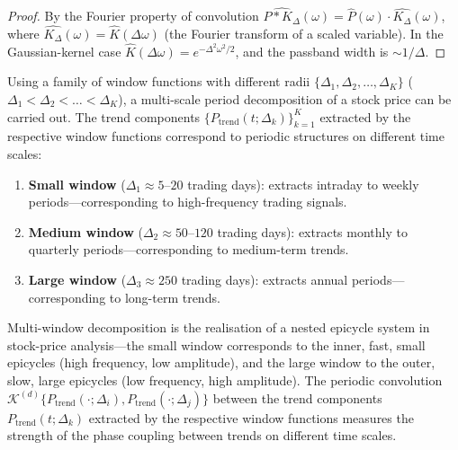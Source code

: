 \begin{proof}
By the Fourier property of convolution $\widehat{P * K_\Delta}(\omega) = \hat P(\omega)\cdot \widehat{K_\Delta}(\omega)$, where $\widehat{K_\Delta}(\omega) = \hat K(\Delta\omega)$ (the Fourier transform of a scaled variable). In the Gaussian-kernel case $\hat K(\Delta\omega) = e^{-\Delta^2\omega^2/2}$, and the passband width is $\sim 1/\Delta$.
\end{proof}

\begin{proposition}\label{prop:multi_window_stock}
Using a family of window functions with different radii $\{\Delta_1, \Delta_2, \dots, \Delta_K\}$ ($\Delta_1 < \Delta_2 < \dots < \Delta_K$), a multi-scale period decomposition of a stock price can be carried out. The trend components $\{P_{\text{trend}}(t; \Delta_k)\}_{k=1}^{K}$ extracted by the respective window functions correspond to periodic structures on different time scales:
\begin{enumerate}[label=(\roman*)]
    \item \textbf{Small window} ($\Delta_1 \approx 5$--$20$ trading days): extracts intraday to weekly periods---corresponding to high-frequency trading signals.
    \item \textbf{Medium window} ($\Delta_2 \approx 50$--$120$ trading days): extracts monthly to quarterly periods---corresponding to medium-term trends.
    \item \textbf{Large window} ($\Delta_3 \approx 250$ trading days): extracts annual periods---corresponding to long-term trends.
\end{enumerate}
Multi-window decomposition is the realisation of a nested epicycle system in stock-price analysis---the small window corresponds to the inner, fast, small epicycles (high frequency, low amplitude), and the large window to the outer, slow, large epicycles (low frequency, high amplitude). The periodic convolution $\mathcal{K}^{(d)}\{P_{\text{trend}}(\cdot; \Delta_i), P_{\text{trend}}(\cdot; \Delta_j)\}$ between the trend components $P_{\text{trend}}(t; \Delta_k)$ extracted by the respective window functions measures the strength of the phase coupling between trends on different time scales.
\end{proposition}

